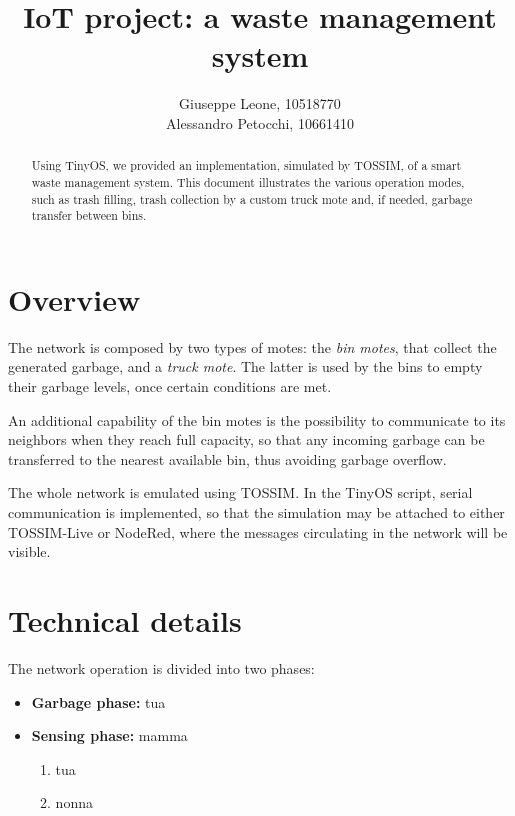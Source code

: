 \documentclass[]{article}
\title{IoT project: a waste management system}
\author{Giuseppe Leone, 10518770 \\ Alessandro Petocchi, 10661410}
\date{}
\begin{document}
\maketitle

\begin{abstract}
	\noindent Using TinyOS, we provided an implementation, simulated by TOSSIM, of a smart waste management system. This document illustrates the various operation modes, such as trash filling, trash collection by a custom truck mote and, if needed, garbage transfer between bins. 
\end{abstract}

\section{Overview}
The network is composed by two types of motes: the \textit{bin motes}, that collect the generated garbage, and a \textit{truck mote}. The latter is used by the bins to empty their garbage levels, once certain conditions are met.

An additional capability of the bin motes is the possibility to communicate to its neighbors when they reach full capacity, so that any incoming garbage can be transferred to the nearest available bin, thus avoiding garbage overflow.

The whole network is emulated using TOSSIM. In the TinyOS script, serial communication is implemented, so that the simulation may be attached to either TOSSIM-Live or NodeRed, where the messages circulating in the network will be visible.
\section{Technical details}
The network operation is divided into two phases:
\begin{itemize}
	\item \textbf{Garbage phase:} tua
	\item \textbf{Sensing phase:} mamma
	\begin{enumerate}
		\item tua
		\item nonna
	\end{enumerate}
\end{itemize}
\end{document}
